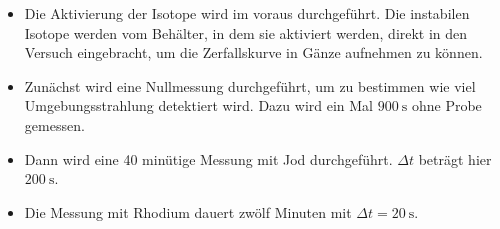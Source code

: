 \begin{itemize}
  \item Die Aktivierung der Isotope wird im voraus durchgeführt. Die instabilen Isotope
  werden vom Behälter, in dem sie aktiviert werden,
  direkt in den Versuch eingebracht, um die Zerfallskurve in Gänze aufnehmen zu können.
  \item Zunächst wird eine Nullmessung durchgeführt, um zu bestimmen wie viel
  Umgebungsstrahlung detektiert wird. Dazu wird ein Mal $\SI{900}{\second}$ ohne
  Probe gemessen.
  \item Dann wird eine 40 minütige Messung mit Jod durchgeführt. $\Delta t$
  beträgt hier $\SI{200}{\second}$.
  \item Die Messung mit Rhodium dauert zwölf Minuten mit $\Delta t = \SI{20}{\second}$.

\end{itemize}
